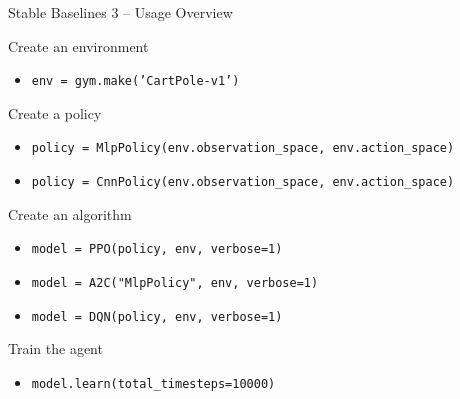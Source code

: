 \documentclass[presentation, 9pt]{beamer}\mode<presentation>{\usetheme{AMSBolognaFC}}
\begin{document}
\begin{frame}{Stable Baselines 3 -- Usage Overview}
	\begin{block}{Create an environment}
		\begin{itemize}
			\item \texttt{env = gym.make('CartPole-v1')}
		\end{itemize}
	\end{block}
	\begin{block}{Create a policy}
		\begin{itemize}
			\item \texttt{policy = MlpPolicy(env.observation\_space, env.action\_space)}
			\item \texttt{policy = CnnPolicy(env.observation\_space, env.action\_space)}
		\end{itemize}
	\end{block}
	\begin{block}{Create an algorithm}
		\begin{itemize}
			\item \texttt{model = PPO(policy, env, verbose=1)}
			\item \texttt{model = A2C("MlpPolicy", env, verbose=1)}
			\item \texttt{model = DQN(policy, env, verbose=1)}
		\end{itemize}
	\end{block}
	\begin{block}{Train the agent}
		\begin{itemize}
			\item \texttt{model.learn(total\_timesteps=10000)}
		\end{itemize}
	\end{block}
\end{frame}
\end{document}
